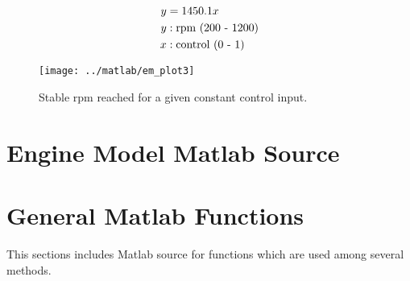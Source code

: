 \documentclass{article}
\begin{document}
\begin{align}
y &= 1450.1 x \label{eq:stable} \\
	y &: \text{rpm (200 - 1200)} \notag \\
	x &: \text{control (0 - 1)} \notag
\end{align}

\begin{figure}[htbp!]
\begin{center}
\texttt{[image: ../matlab/em\_plot3]}
\end{center}
\caption{Stable rpm reached for a given constant control input.}
\label{fig:stable}
\end{figure}

\clearpage


\clearpage
\section{Engine Model Matlab Source}
\label{app:em_matlab}





\clearpage


\clearpage


\clearpage
\section{General Matlab Functions}
\label{app:gf_matlab}

This sections includes Matlab source for functions which are
used among several methods.


\end{document}
